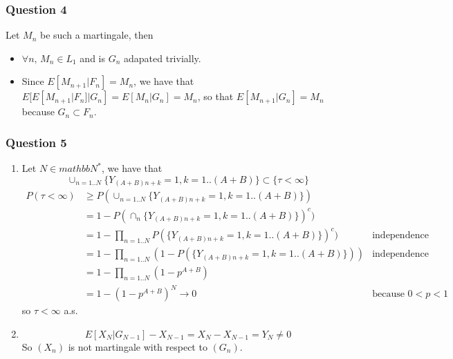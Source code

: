 \documentclass[12pt]{article}
\newcommand{\Q}[1]{\subsubsection*{Question #1}}
\begin{document}
\Q{4} Let $M_n$ be such a martingale, then
\begin{itemize}
  \item $\forall n, \,  M_n \in L_1$ and is $G_n$ adapated trivially.
\item 
Since $E[ M_{n+1} | F_n] = M_n$, we have that $E[E[ M_{n+1} | F_n]|G_n] = E[M_n|G_n] = M_n$, so that
$E[ M_{n+1} | G_n] = M_n$ because $G_n \subset F_n$.
\end{itemize}
\Q{5}
\begin{enumerate}[label=\alph*)]
\item
  Let $N \in mathbb{N}^*$, we have that
  $$ \cup_{n=1..N} \{ Y_{(A+B)n + k} = 1, k=1..(A+B) \} \subset \{ \tau <  \infty \}$$
\begin{align*}
  P(\tau < \infty) &\ge P(\cup_{n=1..N} \{ Y_{(A+B)n + k} = 1, k=1..(A+B) \})
  \\&= 1 - P(\cap_n \{ Y_{(A+B)n + k} = 1, k=1..(A+B) \})^c)
  \\&= 1 - \prod_{n=1..N} P(\{ Y_{(A+B)n + k} = 1, k=1..(A+B) \})^c) &\text{independence}
  \\&= 1 - \prod_{n=1..N} (1-P(\{ Y_{(A+B)n + k} = 1, k=1..(A+B) \}))&\text{independence}
  \\&= 1 - \prod_{n=1..N} (1-p^{A+B})
  \\&= 1 - (1-p^{A+B})^N \rightarrow 0 &\text{because $0 < p < 1$}
\end{align*}
so $\tau < \infty$ a.s.
\item
  $$E[X_N | G_{N-1}] - X_{N-1} = X_N - X_{N-1} = Y_N \ne 0$$
  So $(X_n)$ is not martingale with respect to $(G_n)$.
\end{enumerate}
\end{document}
